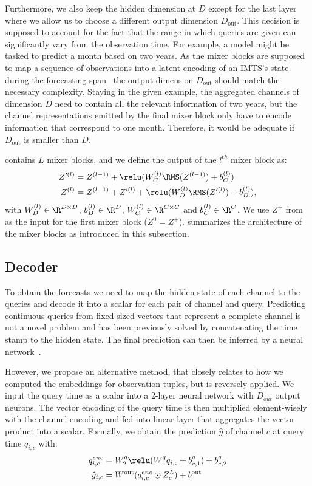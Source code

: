 Furthermore, we also keep the hidden dimension at $D$ except for the last layer where we allow us to choose a different output dimension $D_\text{out}$.
This decision is supposed to account for the fact that the range in which queries are given can significantly vary from the observation time. 
For example, a model might be tasked to predict a month based on two years.
As the mixer blocks are supposed to map a sequence of observations into a latent encoding of an IMTS's state during the forecasting span~\cite{Chen2023.TSMixer,Ekambaram2023.TSMixer}
the output dimension $D_\text{out}$ should match the necessary complexity. 
Staying in the given example, the aggregated channels of dimension $D$ need to contain all the relevant information 
of two years, but the channel representations emitted by the final mixer block only have to encode information that correspond to one month. 
Therefore, it would be adequate if $D_\text{out}$ is smaller than $D$.   

\model{} contains $L$ mixer blocks, and we define the output of the $l^{th}$ mixer block as:
\begin{align}
    Z^{\prime{(l)}} & = Z^{(l-1)} + \relu(W_C^{(l)} \RMS(Z^{(l-1)}) + b_C^{(l)}) \\
    Z^{(l)} & = Z^{(l-1)} +  Z^{\prime{(l)}} + \relu(W_D^{(l)} \RMS(Z^{\prime{(l)}}) + b_D^{(l)}),
\end{align}
with $W_D^{(l)} \in \R^{D\times D}$, $b_D^{(l)} \in \R^D$, $W_C^{(l)} \in \R^{C \times C}$ and $b_C^{(l)} \in \R^C$.
We use $Z^+$ from  as the input for the first mixer block ($Z^0 = Z^+$).  summarizes the architecture of the mixer blocks as introduced in this subsection.
\subsection{Decoder}
To obtain the forecasts we need to map the hidden state of each channel to the queries and decode it into a scalar for each pair of channel and query. 
Predicting continuous queries from fixed-sized vectors that represent a complete channel is not a novel problem and has been previously solved by concatenating the time stamp to the hidden state.
The final prediction can then be inferred by a neural network~\cite{Zhang.Irregular}. 

However, we propose an alternative method, that closely relates to how we computed the embeddings for observation-tuples, but is reversely applied. 
We input the query time as a scalar into a 2-layer neural network with $D_{out}$ output neurons. 
The vector encoding of the query time is then multiplied element-wisely with the channel encoding and fed into linear layer that aggregates the vector product into a scalar.
Formally, we obtain the prediction $\hat{y}$ of channel $c$ at query time $q_{i,c}$ with:
\begin{align}
    q^{enc}_{i,c} &=  W^{q}_2 \relu(W^{q}_1  q_{i,c}  + b^{q}_{c,1}) + b^{q}_{c,2} \\
    \hat{y}_{i,c} &=  W^{\text{out}} (q^{enc}_{i,c} \odot Z^L_c)  + b^\text{out} 
\end{align}
